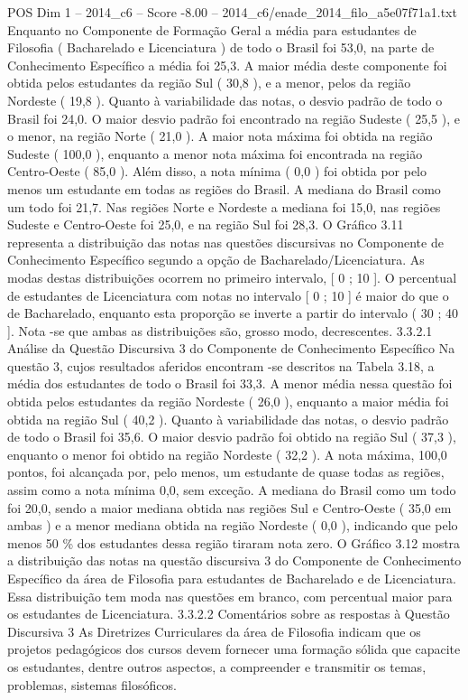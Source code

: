 \begin{textsample}{POS Dim 1 – 2014\_c6 – Score -8.00 – 2014\_c6/enade\_2014\_filo\_a5e07f71a1.txt}
Enquanto no Componente de Formação Geral a média para estudantes de Filosofia ( Bacharelado e Licenciatura ) de todo o Brasil foi 53,0, na parte de Conhecimento Específico a média foi 25,3.
A maior média deste componente foi obtida pelos estudantes da região Sul ( 30,8 ), e a menor, pelos da região Nordeste ( 19,8 ).
Quanto à variabilidade das notas, o desvio padrão de todo o Brasil foi 24,0.
O maior desvio padrão foi encontrado na região Sudeste ( 25,5 ), e o menor, na região Norte ( 21,0 ).
A maior nota máxima foi obtida na região Sudeste ( 100,0 ), enquanto a menor nota máxima foi encontrada na região Centro-Oeste ( 85,0 ).
Além disso, a nota mínima ( 0,0 ) foi obtida por pelo menos um estudante em todas as regiões do Brasil.
A mediana do Brasil como um todo foi 21,7.
Nas regiões Norte e Nordeste a mediana foi 15,0, nas regiões Sudeste e Centro-Oeste foi 25,0, e na região Sul foi 28,3.
O Gráfico 3.11 representa a distribuição das notas nas questões discursivas no Componente de Conhecimento Específico segundo a opção de Bacharelado/Licenciatura.
As modas destas distribuições ocorrem no primeiro intervalo, [ 0 ; 10 ].
O percentual de estudantes de Licenciatura com notas no intervalo [ 0 ; 10 ] é maior do que o de Bacharelado, enquanto esta proporção se inverte a partir do intervalo ( 30 ; 40 ].
Nota -se que ambas as distribuições são, grosso modo, decrescentes. 3.3.2.1 Análise da Questão Discursiva 3 do Componente de Conhecimento Específico Na questão 3, cujos resultados aferidos encontram -se descritos na Tabela 3.18, a média dos estudantes de todo o Brasil foi 33,3.
A menor média nessa questão foi obtida pelos estudantes da região Nordeste ( 26,0 ), enquanto a maior média foi obtida na região Sul ( 40,2 ).
Quanto à variabilidade das notas, o desvio padrão de todo o Brasil foi 35,6.
O maior desvio padrão foi obtido na região Sul ( 37,3 ), enquanto o menor foi obtido na região Nordeste ( 32,2 ).
A nota máxima, 100,0 pontos, foi alcançada por, pelo menos, um estudante de quase todas as regiões, assim como a nota mínima 0,0, sem exceção.
A mediana do Brasil como um todo foi 20,0, sendo a maior mediana obtida nas regiões Sul e Centro-Oeste ( 35,0 em ambas ) e a menor mediana obtida na região Nordeste ( 0,0 ), indicando que pelo menos 50 \% dos estudantes dessa região tiraram nota zero.
O Gráfico 3.12 mostra a distribuição das notas na questão discursiva 3 do Componente de Conhecimento Específico da área de Filosofia para estudantes de Bacharelado e de Licenciatura.
Essa distribuição tem moda nas questões em branco, com percentual maior para os estudantes de Licenciatura. 3.3.2.2 Comentários sobre as respostas à Questão Discursiva 3 As Diretrizes Curriculares da área de Filosofia indicam que os projetos pedagógicos dos cursos devem fornecer uma formação sólida que capacite os estudantes, dentre outros aspectos, a compreender e transmitir os temas, problemas, sistemas filosóficos.

\end{textsample}
